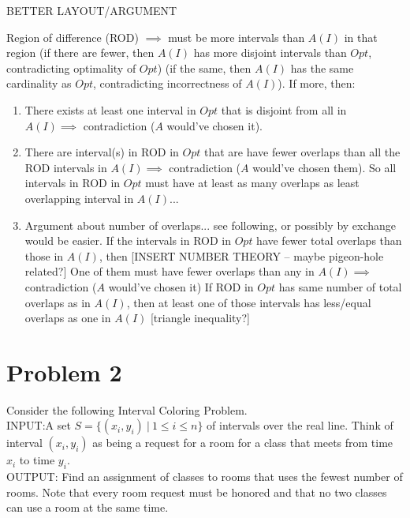 \documentclass{article}
\begin{document}
    BETTER LAYOUT/ARGUMENT
    
    
    

    Region of difference (ROD) $\implies$ must be more intervals than $A(I)$ in that region (if there are fewer, then $A(I)$ has more disjoint intervals than $Opt$, contradicting optimality of $Opt$) (if the same, then $A(I)$ has the same cardinality as $Opt$, contradicting incorrectness of $A(I)$). If more, then:
    
    \begin{enumerate}
        \item There exists at least one interval in $Opt$ that is disjoint from all in $A(I) \implies$ contradiction ($A$ would've chosen it).
        
        \item There are interval(s) in ROD in $Opt$ that are have fewer overlaps than all the ROD intervals in $A(I) \implies $ contradiction ($A$ would've chosen them).
        So all intervals in ROD in $Opt$ must have at least as many overlaps as least overlapping interval in $A(I)$...
        
        \item Argument about number of overlaps... see following, or possibly by exchange would be easier.
        If the intervals in ROD in $Opt$ have fewer total overlaps than those in $A(I)$, then [INSERT NUMBER THEORY -- maybe pigeon-hole related?]
        One of them must have fewer overlaps than any in $A(I) \implies$ contradiction ($A$ would've chosen it)
        If ROD in $Opt$ has same number of total overlaps as in $A(I)$, then at least one of those intervals has less/equal overlaps as one in $A(I)$
        [triangle inequality?]
    \end{enumerate}
    
    
    \section*{Problem 2}
    
    Consider the following Interval Coloring Problem.\\
    INPUT:A set $S = \{(x_i, y_i)\ |\ 1 \leq i \leq n\}$ of intervals over the real line. Think of interval $(x_i, y_i)$ as being a request for a room for a class that meets from time $x_i$ to time $y_i$.\\
    OUTPUT: Find an assignment of classes to rooms that uses the fewest number of rooms.
    Note that every room request must be honored and that no two classes can use a room at the same
    time.
    
\end{document}
